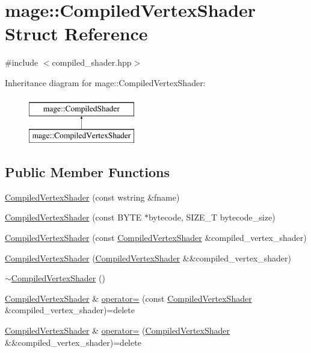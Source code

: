 \hypertarget{structmage_1_1_compiled_vertex_shader}{}\section{mage\+:\+:Compiled\+Vertex\+Shader Struct Reference}
\label{structmage_1_1_compiled_vertex_shader}


{\ttfamily \#include $<$compiled\+\_\+shader.\+hpp$>$}

Inheritance diagram for mage\+:\+:Compiled\+Vertex\+Shader\+:\begin{figure}[H]
\begin{center}
\leavevmode
\includegraphics[height=2.000000cm]{structmage_1_1_compiled_vertex_shader}
\end{center}
\end{figure}
\subsection*{Public Member Functions}
\begin{DoxyCompactItemize}
\item 
\hyperlink{structmage_1_1_compiled_vertex_shader_a6d7c45d00130a68ee11beb1840d2756e}{Compiled\+Vertex\+Shader} (const wstring \&fname)
\item 
\hyperlink{structmage_1_1_compiled_vertex_shader_a1da7cb2d4355e1f7ed5c934774af3007}{Compiled\+Vertex\+Shader} (const B\+Y\+TE $\ast$bytecode, S\+I\+Z\+E\+\_\+T bytecode\+\_\+size)
\item 
\hyperlink{structmage_1_1_compiled_vertex_shader_a156fd9a15eae0ade081781c1f3263584}{Compiled\+Vertex\+Shader} (const \hyperlink{structmage_1_1_compiled_vertex_shader}{Compiled\+Vertex\+Shader} \&compiled\+\_\+vertex\+\_\+shader)
\item 
\hyperlink{structmage_1_1_compiled_vertex_shader_a97c8c7d797a9fffd6005562ecf732fb8}{Compiled\+Vertex\+Shader} (\hyperlink{structmage_1_1_compiled_vertex_shader}{Compiled\+Vertex\+Shader} \&\&compiled\+\_\+vertex\+\_\+shader)
\item 
\hyperlink{structmage_1_1_compiled_vertex_shader_a556e30c4386f3ef83571bbe8eb366d19}{$\sim$\+Compiled\+Vertex\+Shader} ()
\item 
\hyperlink{structmage_1_1_compiled_vertex_shader}{Compiled\+Vertex\+Shader} \& \hyperlink{structmage_1_1_compiled_vertex_shader_a9ce8c846d9c29ffd67a19cffd362b709}{operator=} (const \hyperlink{structmage_1_1_compiled_vertex_shader}{Compiled\+Vertex\+Shader} \&compiled\+\_\+vertex\+\_\+shader)=delete
\item 
\hyperlink{structmage_1_1_compiled_vertex_shader}{Compiled\+Vertex\+Shader} \& \hyperlink{structmage_1_1_compiled_vertex_shader_ae42ff3528b8a4b58c3d9f085d0d4573e}{operator=} (\hyperlink{structmage_1_1_compiled_vertex_shader}{Compiled\+Vertex\+Shader} \&\&compiled\+\_\+vertex\+\_\+shader)=delete
\end{DoxyCompactItemize}


